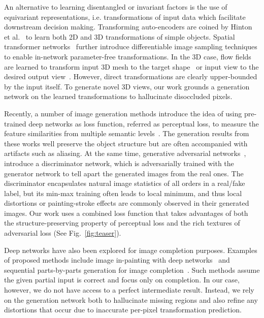 \documentclass[10pt,twocolumn,letterpaper]{article}
\begin{document}
An alternative to learning disentangled or invariant factors is the use of equivariant representations, i.e. transformations of input data which facilitate downstream decision making. Transforming auto-encoders are coined by Hinton et al.~\cite{hinton2011transforming} to learn both 2D and 3D transformations of simple objects. Spatial transformer networks~\cite{jaderberg_NIPS2015} further introduce differentiable image sampling techniques to enable in-network parameter-free transformations. In the 3D case, flow fields are learned to transform input 3D mesh to the target shape~\cite{yumer2016learning} or input view to the desired output view~\cite{Zhou_eccv2016}. However, direct transformations are clearly upper-bounded by the input itself. To generate novel 3D views, our work grounds a generation network on the learned transformations to hallucinate disoccluded pixels.

Recently, a number of image generation methods introduce the idea of using pre-trained deep networks as loss function, referred as perceptual loss, to measure the feature similarities from multiple semantic levels~\cite{johnson_eccv2016,larsen_icml2016,ulyanov_icml2016,lamb2016discriminative}. The generation results from these works well preserve the object structure but are often accompanied with artifacts such as aliasing. At the same time, generative adversarial networks~\cite{Goodfellow_nips2014,Radford_iclr2016}, introduce a discriminator network, which is adversarially trained with the generator network to tell apart the generated images from the real ones. The discriminator encapsulates natural image statistics of all orders in a real/fake label, but its min-max training often leads to local minimum, and thus local distortions or painting-stroke effects are commonly observed in their generated images. Our work uses a combined loss function that takes advantages of both the structure-preserving property of perceptual loss and the rich textures of adversarial loss (See Fig.~\ref{fig:teaser}).

Deep networks have also been explored for image completion purposes. Examples of proposed methods include image in-painting with deep networks~\cite{pathak_cvpr2016} and sequential parts-by-parts generation for image completion~\cite{kwak_arxiv2016}. Such methods assume the given partial input is correct and focus only on completion. In our case, however, we do not have access to a perfect intermediate result. Instead, we rely on the generation network both to hallucinate missing regions and also refine any distortions that occur due to inaccurate per-pixel transformation prediction.
\end{document}
